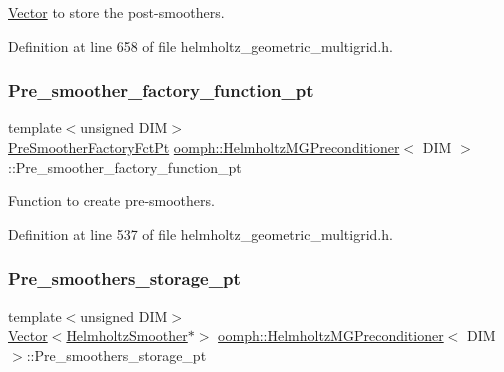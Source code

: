 \hyperlink{classoomph_1_1Vector}{Vector} to store the post-\/smoothers. 



Definition at line 658 of file helmholtz\+\_\+geometric\+\_\+multigrid.\+h.

\mbox{\label{classoomph_1_1HelmholtzMGPreconditioner_a22d2d1b715d6789ea56301d79a952d6a}} 
\subsubsection{\texorpdfstring{Pre\+\_\+smoother\+\_\+factory\+\_\+function\+\_\+pt}{Pre\_smoother\_factory\_function\_pt}}
{\footnotesize\ttfamily template$<$unsigned D\+IM$>$ \\
\hyperlink{classoomph_1_1HelmholtzMGPreconditioner_ac17ab35f36cad29ce8f1e64593c90a95}{Pre\+Smoother\+Factory\+Fct\+Pt} \hyperlink{classoomph_1_1HelmholtzMGPreconditioner}{oomph\+::\+Helmholtz\+M\+G\+Preconditioner}$<$ D\+IM $>$\+::Pre\+\_\+smoother\+\_\+factory\+\_\+function\+\_\+pt\hspace{0.3cm}{\ttfamily [private]}}



Function to create pre-\/smoothers. 



Definition at line 537 of file helmholtz\+\_\+geometric\+\_\+multigrid.\+h.

\mbox{\label{classoomph_1_1HelmholtzMGPreconditioner_ab00508738be7bfdf669d54cef639838f}} 
\subsubsection{\texorpdfstring{Pre\+\_\+smoothers\+\_\+storage\+\_\+pt}{Pre\_smoothers\_storage\_pt}}
{\footnotesize\ttfamily template$<$unsigned D\+IM$>$ \\
\hyperlink{classoomph_1_1Vector}{Vector}$<$\hyperlink{classoomph_1_1HelmholtzSmoother}{Helmholtz\+Smoother}$\ast$$>$ \hyperlink{classoomph_1_1HelmholtzMGPreconditioner}{oomph\+::\+Helmholtz\+M\+G\+Preconditioner}$<$ D\+IM $>$\+::Pre\+\_\+smoothers\+\_\+storage\+\_\+pt\hspace{0.3cm}{\ttfamily [private]}}




